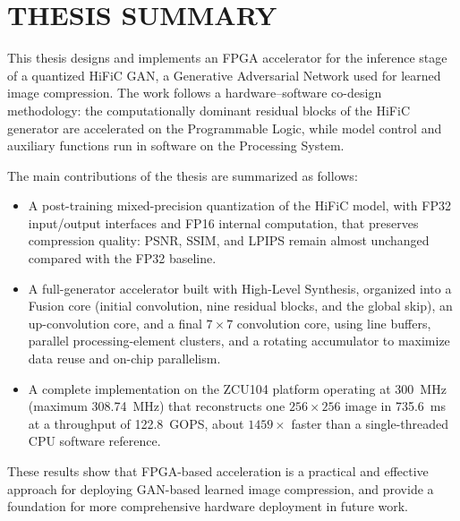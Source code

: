 \section*{THESIS SUMMARY}

This thesis designs and implements an FPGA accelerator for the inference stage of a quantized HiFiC GAN, a Generative Adversarial Network used for learned image compression. The work follows a hardware--software co-design methodology: the computationally dominant residual blocks of the HiFiC generator are accelerated on the Programmable Logic, while model control and auxiliary functions run in software on the Processing System.

The main contributions of the thesis are summarized as follows:
\begin{itemize}
    \item A post-training mixed-precision quantization of the HiFiC model, with FP32 input/output interfaces and FP16 internal computation, that preserves compression quality: PSNR, SSIM, and LPIPS remain almost unchanged compared with the FP32 baseline.
    \item A full-generator accelerator built with High-Level Synthesis, organized into a Fusion core (initial convolution, nine residual blocks, and the global skip), an up-convolution core, and a final $7\times7$ convolution core, using line buffers, parallel processing-element clusters, and a rotating accumulator to maximize data reuse and on-chip parallelism.
    \item A complete implementation on the ZCU104 platform operating at 300~MHz (maximum 308.74~MHz) that reconstructs one $256\times256$ image in 735.6~ms at a throughput of 122.8~GOPS, about $1459\times$ faster than a single-threaded CPU software reference.
\end{itemize}

These results show that FPGA-based acceleration is a practical and effective approach for deploying GAN-based learned image compression, and provide a foundation for more comprehensive hardware deployment in future work.

\cleardoublepage
